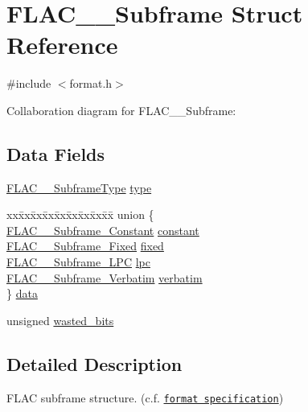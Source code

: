 \hypertarget{struct_f_l_a_c_____subframe}{}\section{F\+L\+A\+C\+\_\+\+\_\+\+Subframe Struct Reference}
\label{struct_f_l_a_c_____subframe}


{\ttfamily \#include $<$format.\+h$>$}



Collaboration diagram for F\+L\+A\+C\+\_\+\+\_\+\+Subframe\+:
\subsection*{Data Fields}
\begin{DoxyCompactItemize}
\item 
\hyperlink{group__flac__format_ga1f431eaf213e74d7747589932d263348}{F\+L\+A\+C\+\_\+\+\_\+\+Subframe\+Type} \hyperlink{struct_f_l_a_c_____subframe_a1de133ee69f416636e24a990d4bd6b44}{type}
\item 
\begin{tabbing}
xx\=xx\=xx\=xx\=xx\=xx\=xx\=xx\=xx\=\kill
union \{\\
\>\hyperlink{struct_f_l_a_c_____subframe___constant}{FLAC\_\_Subframe\_Constant} \hyperlink{struct_f_l_a_c_____subframe_a2b6c0b6a78e11a3f07ad018ebdbae053}{constant}\\
\>\hyperlink{struct_f_l_a_c_____subframe___fixed}{FLAC\_\_Subframe\_Fixed} \hyperlink{struct_f_l_a_c_____subframe_a62b0c96288ec264ca09aba6c7c26fc0b}{fixed}\\
\>\hyperlink{struct_f_l_a_c_____subframe___l_p_c}{FLAC\_\_Subframe\_LPC} \hyperlink{struct_f_l_a_c_____subframe_a298cb7680a387b1b95815cd51648f400}{lpc}\\
\>\hyperlink{struct_f_l_a_c_____subframe___verbatim}{FLAC\_\_Subframe\_Verbatim} \hyperlink{struct_f_l_a_c_____subframe_ae7b7d3263298a9326f3ac3e9d56b2a6c}{verbatim}\\
\} \hyperlink{struct_f_l_a_c_____subframe_a16393e0dc0d23af87e7ea8d1cb8e9e32}{data}\\

\end{tabbing}\item 
unsigned \hyperlink{struct_f_l_a_c_____subframe_a96a6848ded4e90e26d54f0dd7066c306}{wasted\+\_\+bits}
\end{DoxyCompactItemize}


\subsection{Detailed Description}
F\+L\+AC subframe structure. (c.\+f. \href{../format.html#subframe}{\tt format specification}) 

